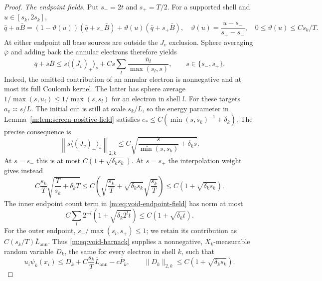 \begin{proof}
\medskip\noindent
\emph{The endpoint fields.}
Put $s_-=2t$ and $s_+=T/2$.  For a supported shell and $u\in[s_k,2s_k]$,
\[
 \bar q+u\bar B
 =(1-\vartheta(u))(\bar q+s_-\bar B)
      +\vartheta(u)(\bar q+s_+\bar B),
 \quad
 \vartheta(u)=\frac{u-s_-}{s_+-s_-},
 \quad 0\le\vartheta(u)\le C s_k/T.
\]
At either endpoint all base sources are outside the $J_v$ exclusion.
Sphere averaging $\bar\varphi$ and adding back the annular electrons
therefore yields
\begin{equation}\label{m:eq:void-endpoint-field}
 \bar q+s\bar B\le
 s\langle(\overline{J_v})_+\rangle_s
       +Cs\sum_l\frac{\bar n_l}{\max(s_l,s)},
 \qquad s\in\{s_-,s_+\}.
\end{equation}
Indeed, the omitted contribution of an annular electron is nonnegative
and at most its full Coulomb kernel.  The latter has sphere average
$1/\max(s,u_i)\le1/\max(s,s_l)$ for an electron in shell $l$.
For these targets $a_v\asymp s/L$.  The initial cut is still at scale
$s_k/L$, so the energy parameter in
Lemma~\ref{m:lem:screen-positive-field} satisfies
$e_*\le C(\min(s,s_k)^{-1}+\delta_k)$.  The precise consequence is
\begin{equation}\label{m:eq:void-endpoint-norm}
 \left\|s\langle(\overline{J_v})_+\rangle_s\right\|_{2,k}
 \le C\sqrt{\frac{s}{\min(s,s_k)}+\delta_k s}.
\end{equation}
At $s=s_-$ this is at most $C(1+\sqrt{\delta_k s_k})$.
At $s=s_+$ the interpolation weight gives instead
\[
 C\frac{s_k}{T}\sqrt{\frac{T}{s_k}+\delta_k T}
 \le C\left(\sqrt{\frac{s_k}{T}}
       +\sqrt{\delta_k s_k}\sqrt{\frac{s_k}{T}}\right)
 \le C(1+\sqrt{\delta_k s_k}).
\]
The inner endpoint count term in \eqref{m:eq:void-endpoint-field} has
norm at most
\[
 C\sum_l2^{-l}(1+\sqrt{\delta_k2^lt})
 \le C(1+\sqrt{\delta_k t}).
\]
For the outer endpoint, $s_+/\max(s_l,s_+)\le1$; we retain its
contribution as $C(s_k/T)\bar L_{\mathrm{ann}}$.
Thus \eqref{m:eq:void-harnack} supplies a nonnegative, $X_k$-measurable
random variable $D_k$, the same for every electron in shell $k$,
such that
\begin{equation}\label{m:eq:void-final-field-bound}
 u_i\psi_k(x_i)\le D_k+C\frac{s_k}{T}\bar L_{\mathrm{ann}}-c\bar P_k,
 \qquad \|D_k\|_{2,k}\le C(1+\sqrt{\delta_k s_k}).
\end{equation}


\end{proof}
